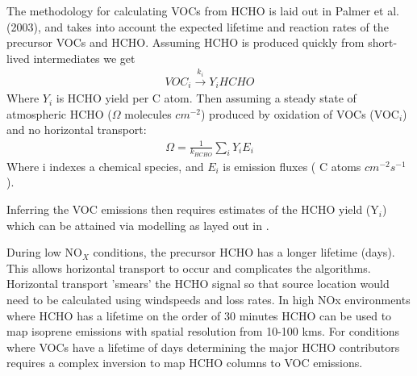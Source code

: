 The methodology for calculating VOCs from HCHO is laid out in Palmer et al. (2003), and takes into account the expected lifetime and reaction rates of the precursor VOCs and HCHO.
Assuming HCHO is produced quickly from short-lived intermediates we get
\begin{eqnarray*}
VOC_i \overset{k_i}{\rightarrow} Y_i HCHO
\end{eqnarray*}
Where $Y_i$ is HCHO yield per C atom.
Then assuming a steady state of atmospheric HCHO ($\Omega$ molecules $cm^{-2}$) produced by oxidation of VOCs (VOC$_i$) and no horizontal transport:
\begin{eqnarray*}
\Omega = \frac{1}{k_{HCHO}} \sum_{i} Y_i E_i
\end{eqnarray*}
Where i indexes a chemical species, and $E_i$ is emission fluxes ( C atoms $cm^{-2}s^{-1}$).

Inferring the VOC emissions then requires estimates of the HCHO yield (Y$_i$) which can be attained via modelling as layed out in \citet{Millet_2006}.

During low NO$_X$ conditions, the precursor HCHO has a longer lifetime (days).
This allows horizontal transport to occur and complicates the algorithms.
Horizontal transport 'smears' the HCHO signal so that source location would need to be calculated using windspeeds and loss rates.
In high NOx environments where HCHO has a lifetime on the order of 30 minutes HCHO can be used to map isoprene emissions with spatial resolution from 10-100 kms.
For conditions where VOCs have a lifetime of days determining the major HCHO contributors requires a complex inversion to map HCHO columns to VOC emissions.

